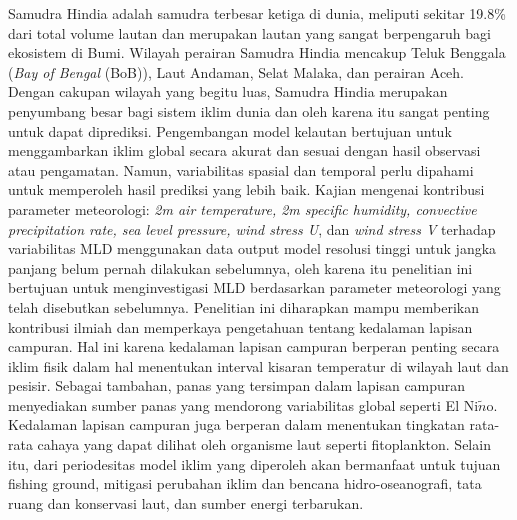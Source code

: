\begin{spacing}{1.5}
	\pagestyle{empty}
	\begin{center}
		\vskip 1cm
		\justifying
		Samudra Hindia adalah samudra terbesar ketiga di dunia, meliputi sekitar 19.8\% dari total volume lautan dan merupakan lautan yang sangat berpengaruh bagi ekosistem di Bumi. Wilayah perairan Samudra Hindia mencakup Teluk Benggala (\textit{Bay of Bengal} (BoB)), Laut Andaman, Selat Malaka, dan perairan Aceh. Dengan cakupan wilayah yang begitu luas, Samudra Hindia merupakan penyumbang besar bagi sistem iklim dunia dan oleh karena itu sangat penting untuk dapat diprediksi. Pengembangan model kelautan bertujuan untuk menggambarkan iklim global secara akurat dan sesuai dengan hasil observasi atau pengamatan. Namun, variabilitas spasial dan temporal perlu dipahami untuk memperoleh hasil prediksi yang lebih baik. Kajian mengenai kontribusi parameter meteorologi: \textit{2m air temperature, 2m specific humidity, convective precipitation rate, sea level pressure, wind stress U}, dan \textit{wind stress V} terhadap variabilitas MLD menggunakan data output model resolusi tinggi untuk jangka panjang belum pernah dilakukan sebelumnya, oleh karena itu penelitian ini bertujuan untuk menginvestigasi MLD berdasarkan parameter meteorologi yang telah disebutkan sebelumnya. Penelitian ini diharapkan mampu memberikan kontribusi ilmiah dan memperkaya pengetahuan tentang kedalaman lapisan campuran. Hal ini karena kedalaman lapisan campuran berperan penting secara iklim fisik dalam hal menentukan interval kisaran temperatur di wilayah laut dan pesisir. Sebagai tambahan, panas yang tersimpan dalam lapisan campuran menyediakan sumber panas yang mendorong variabilitas global seperti El Ni$\tilde{n}$o. Kedalaman lapisan campuran juga berperan dalam menentukan tingkatan rata-rata cahaya yang dapat dilihat oleh organisme laut seperti fitoplankton. Selain itu, dari periodesitas model iklim yang diperoleh akan bermanfaat untuk tujuan fishing ground, mitigasi perubahan iklim dan bencana hidro-oseanografi, tata ruang dan konservasi laut, dan sumber energi terbarukan.
	\end{center}
\end{spacing}
\pagestyle{empty}